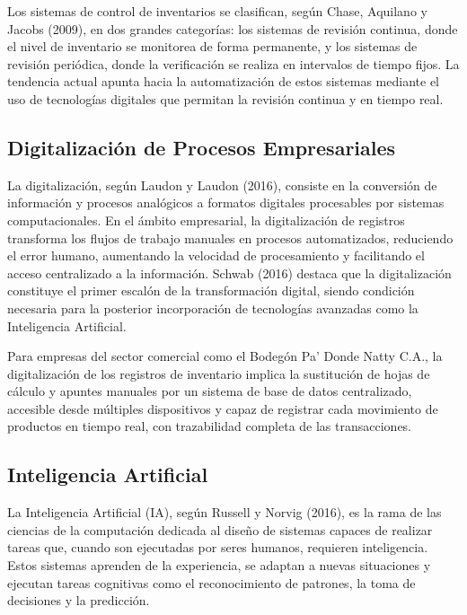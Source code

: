 \documentclass[12pt, letterpaper]{report}
\begin{document}
Los sistemas de control de inventarios se clasifican, según Chase,
Aquilano y Jacobs (2009), en dos grandes categorías: los sistemas de
revisión continua, donde el nivel de inventario se monitorea de forma
permanente, y los sistemas de revisión periódica, donde la
verificación se realiza en intervalos de tiempo fijos. La tendencia
actual apunta hacia la automatización de estos sistemas mediante el uso
de tecnologías digitales que permitan la revisión continua y en tiempo
real.

\subsection{Digitalización de Procesos Empresariales}

La digitalización, según Laudon y Laudon (2016), consiste en la
conversión de información y procesos analógicos a formatos digitales
procesables por sistemas computacionales. En el ámbito empresarial, la
digitalización de registros transforma los flujos de trabajo manuales
en procesos automatizados, reduciendo el error humano, aumentando la
velocidad de procesamiento y facilitando el acceso centralizado a la
información. Schwab (2016) destaca que la digitalización constituye
el primer escalón de la transformación digital, siendo condición
necesaria para la posterior incorporación de tecnologías avanzadas
como la Inteligencia Artificial.

Para empresas del sector comercial como el Bodegón Pa' Donde Natty
C.A., la digitalización de los registros de inventario implica la
sustitución de hojas de cálculo y apuntes manuales por un sistema de
base de datos centralizado, accesible desde múltiples dispositivos y
capaz de registrar cada movimiento de productos en tiempo real, con
trazabilidad completa de las transacciones.

\subsection{Inteligencia Artificial}

La Inteligencia Artificial (IA), según Russell y Norvig (2016), es la
rama de las ciencias de la computación dedicada al diseño de sistemas
capaces de realizar tareas que, cuando son ejecutadas por seres humanos,
requieren inteligencia. Estos sistemas aprenden de la experiencia, se
adaptan a nuevas situaciones y ejecutan tareas cognitivas como el
reconocimiento de patrones, la toma de decisiones y la predicción.
\end{document}
